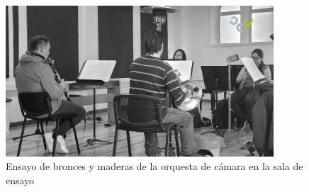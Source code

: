 \begin{figure}[H]
    \centering
    \includegraphics[width=10cm]{Imagenes/OCV/OCV vientos.jpg}
    \caption{Ensayo de bronces y maderas de la orquesta de cámara en la sala de ensayo}
    \label{fig: ensayo vientos OCV}
\end{figure}